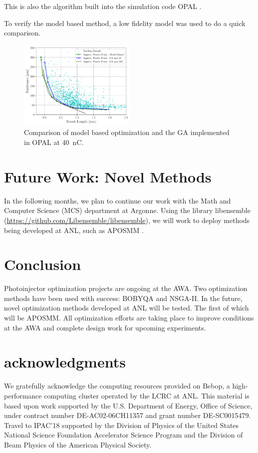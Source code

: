 \documentclass[letterpaper,  %
              ]{jacow-2_3}   %
\begin{document}
 
This is also the algorithm built into the simulation code 
OPAL \cite{opal}. 

To verify the model based method, a low fidelity model was used to do 
a quick comparison.  
\begin{figure}
	\includegraphics[width=0.5\textwidth]{model_vs_ga}
	\caption{Comparison of model based optimization and the GA implemented in OPAL at \SI{40}{nC}. }
	\label{compare}
\end{figure}


\section{Future Work: Novel Methods}
In the following months, we plan to continue our work with
the Math and Computer Science (MCS) department at Argonne.
Using the library libensemble (\url{https://github.com/Libensemble/libensemble}), 
we will work to deploy methods being developed at ANL, such as APOSMM \cite{jeff}. 


\section{Conclusion}
Photoinjector optimization projects are ongoing at the AWA.
Two optimization methods have been used with success:
BOBYQA and NSGA-II. In the future, novel optimization 
methods developed at ANL will be tested. The first of 
which will be APOSMM. All optimization efforts are taking 
place to improve conditions at the AWA and 
complete design work for upcoming experiments.

\section{acknowledgments}
We gratefully acknowledge the computing resources
provided on Bebop, a high-performance computing cluster
operated by the LCRC at ANL.
This material is based upon work supported by the 
U.S. Department of Energy, Office of Science, under 
contract number DE-AC02-06CH11357 and grant number DE-SC0015479. 
Travel to IPAC'18 supported by the Division of Physics 
of the United States National Science Foundation 
Accelerator Science Program and the Division of 
Beam Physics of the American Physical Society.
\end{document}
